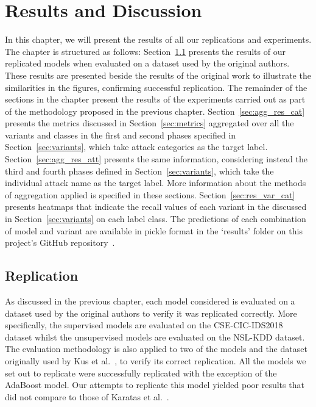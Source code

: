 \graphicspath{{content/chapters/4_results/figures/}}

\chapter{Results and Discussion}%
\label{chp:results}

In this chapter, we will present the results of all our replications and
experiments. The chapter is structured as follows:
Section~\ref{sec:replication} presents the results of our replicated models
when evaluated on a dataset used by the original authors. These results are
presented beside the results of the original work to illustrate the
similarities in the figures, confirming successful replication. The remainder
of the sections in the chapter present the results of the experiments carried
out as part of the methodology proposed in the previous chapter.
Section~\ref{sec:agg_res_cat} presents the metrics discussed in
Section~\ref{sec:metrics} aggregated over all the variants and classes in the
first and second phases specified in Section~\ref{sec:variants}, which take
attack categories as the target label. Section~\ref{sec:agg_res_att} presents
the same information, considering instead the third and fourth phases defined
in Section~\ref{sec:variants}, which take the individual attack name as the
target label. More information about the methods of aggregation applied is
specified in these sections. Section~\ref{sec:res_var_cat} presents heatmaps
that indicate the recall values of each variant in the discussed in
Section~\ref{sec:variants} on each label class. The predictions of each
combination of model and variant are available in pickle format in the
`results' folder on this project's GitHub repository~\cite{repo}.

\section{Replication}%
\label{sec:replication}

As discussed in the previous chapter, each model considered is evaluated on a
dataset used by the original authors to verify it was replicated correctly.
More specifically, the supervised models are evaluated on the CSE-CIC-IDS2018
dataset whilst the unsupervised models are evaluated on the NSL-KDD dataset.
The evaluation methodology is also applied to two of the models and the dataset
originally used by Kus et al.~\cite{Kus}, to verify its correct replication.
All the models we set out to replicate were successfully replicated with the
exception of the AdaBoost model. Our attempts to replicate this model yielded
poor results that did not compare to those of Karatas et al.~\cite{Karatas}.

